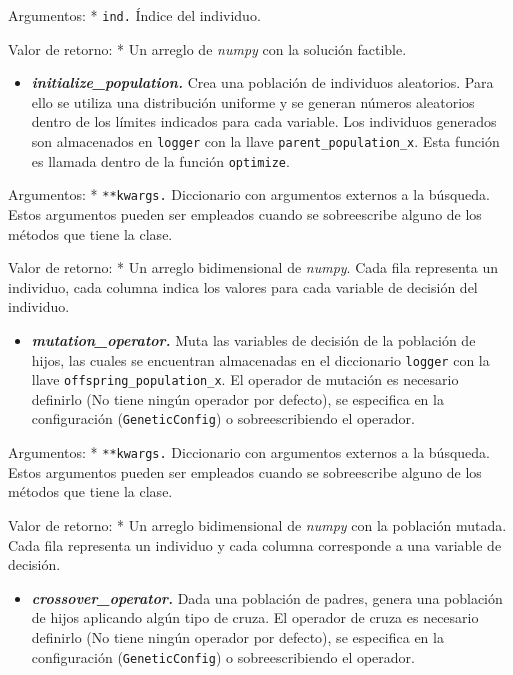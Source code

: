 \documentclass[11pt]{article}
\providecommand{\tightlist}{%
      \setlength{\itemsep}{0pt}\setlength{\parskip}{0pt}}
\begin{document}
Argumentos: * \texttt{ind.} Índice del individuo.

Valor de retorno: * Un arreglo de \emph{numpy} con la solución factible.

    \begin{itemize}
\tightlist
\item
  \emph{\textbf{initialize\_population.}} Crea una población de
  individuos aleatorios. Para ello se utiliza una distribución uniforme
  y se generan números aleatorios dentro de los límites indicados para
  cada variable. Los individuos generados son almacenados en
  \texttt{logger} con la llave \texttt{parent\_population\_x}. Esta
  función es llamada dentro de la función \texttt{optimize}.
\end{itemize}

Argumentos: * \texttt{**kwargs.} Diccionario con argumentos externos a
la búsqueda. Estos argumentos pueden ser empleados cuando se
sobreescribe alguno de los métodos que tiene la clase.

Valor de retorno: * Un arreglo bidimensional de \emph{numpy}. Cada fila
representa un individuo, cada columna indica los valores para cada
variable de decisión del individuo.

    \begin{itemize}
\tightlist
\item
  \emph{\textbf{mutation\_operator.}} Muta las variables de decisión de
  la población de hijos, las cuales se encuentran almacenadas en el
  diccionario \texttt{logger} con la llave
  \texttt{offspring\_population\_x}. El operador de mutación es
  necesario definirlo (No tiene ningún operador por defecto), se
  especifica en la configuración (\texttt{GeneticConfig}) o
  sobreescribiendo el operador.
\end{itemize}

Argumentos: * \texttt{**kwargs.} Diccionario con argumentos externos a
la búsqueda. Estos argumentos pueden ser empleados cuando se
sobreescribe alguno de los métodos que tiene la clase.

Valor de retorno: * Un arreglo bidimensional de \emph{numpy} con la
población mutada. Cada fila representa un individuo y cada columna
corresponde a una variable de decisión.

    \begin{itemize}
\tightlist
\item
  \emph{\textbf{crossover\_operator.}} Dada una población de padres,
  genera una población de hijos aplicando algún tipo de cruza. El
  operador de cruza es necesario definirlo (No tiene ningún operador por
  defecto), se especifica en la configuración (\texttt{GeneticConfig}) o
  sobreescribiendo el operador.
\end{itemize}
\end{document}
